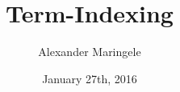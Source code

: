 



\author{Alexander Maringele}
\title{Term-Indexing
}
\date{January 27th, 2016}

%



















 
